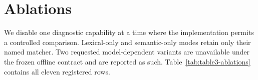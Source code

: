 \section{Ablations}
We disable one diagnostic capability at a time where the implementation permits
a controlled comparison. Lexical-only and semantic-only modes retain only their
named matcher. Two requested model-dependent variants are unavailable under the
frozen offline contract and are reported as such. Table~\ref{tab:table3-ablations}
contains all eleven registered rows.


